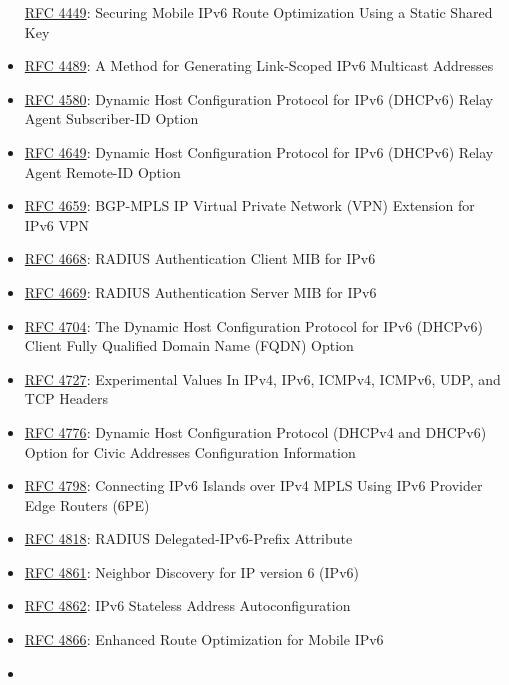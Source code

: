 \documentclass[
]{article}
\begin{document}
\begin{itemize}
  \href{https://www.rfc-editor.org/info/rfc4449}{RFC 4449}: Securing
  Mobile IPv6 Route Optimization Using a Static Shared Key
\item
  \href{https://www.rfc-editor.org/info/rfc4489}{RFC 4489}: A Method for
  Generating Link-Scoped IPv6 Multicast Addresses
\item
  \href{https://www.rfc-editor.org/info/rfc4580}{RFC 4580}: Dynamic Host
  Configuration Protocol for IPv6 (DHCPv6) Relay Agent Subscriber-ID
  Option
\item
  \href{https://www.rfc-editor.org/info/rfc4649}{RFC 4649}: Dynamic Host
  Configuration Protocol for IPv6 (DHCPv6) Relay Agent Remote-ID Option
\item
  \href{https://www.rfc-editor.org/info/rfc4659}{RFC 4659}: BGP-MPLS IP
  Virtual Private Network (VPN) Extension for IPv6 VPN
\item
  \href{https://www.rfc-editor.org/info/rfc4668}{RFC 4668}: RADIUS
  Authentication Client MIB for IPv6
\item
  \href{https://www.rfc-editor.org/info/rfc4669}{RFC 4669}: RADIUS
  Authentication Server MIB for IPv6
\item
  \href{https://www.rfc-editor.org/info/rfc4704}{RFC 4704}: The Dynamic
  Host Configuration Protocol for IPv6 (DHCPv6) Client Fully Qualified
  Domain Name (FQDN) Option
\item
  \href{https://www.rfc-editor.org/info/rfc4727}{RFC 4727}: Experimental
  Values In IPv4, IPv6, ICMPv4, ICMPv6, UDP, and TCP Headers
\item
  \href{https://www.rfc-editor.org/info/rfc4776}{RFC 4776}: Dynamic Host
  Configuration Protocol (DHCPv4 and DHCPv6) Option for Civic Addresses
  Configuration Information
\item
  \href{https://www.rfc-editor.org/info/rfc4798}{RFC 4798}: Connecting
  IPv6 Islands over IPv4 MPLS Using IPv6 Provider Edge Routers (6PE)
\item
  \href{https://www.rfc-editor.org/info/rfc4818}{RFC 4818}: RADIUS
  Delegated-IPv6-Prefix Attribute
\item
  \href{https://www.rfc-editor.org/info/rfc4861}{RFC 4861}: Neighbor
  Discovery for IP version 6 (IPv6)
\item
  \href{https://www.rfc-editor.org/info/rfc4862}{RFC 4862}: IPv6
  Stateless Address Autoconfiguration
\item
  \href{https://www.rfc-editor.org/info/rfc4866}{RFC 4866}: Enhanced
  Route Optimization for Mobile IPv6
\item

\end{itemize}
\end{document}

